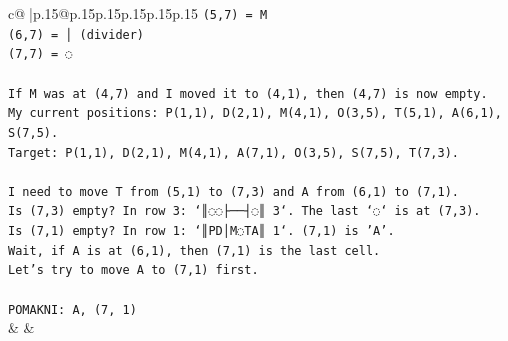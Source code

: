 \documentclass{article}
\begin{document}
{\begin{supertabular}{c@{$\;$}|p{.15\linewidth}@{}p{.15\linewidth}p{.15\linewidth}p{.15\linewidth}p{.15\linewidth}p{.15\linewidth}}
{{{\texttt{(5,7) = M} \\
\texttt{(6,7) = │ (divider)} \\
\texttt{(7,7) = ◌} \\
\\ 
\texttt{If M was at (4,7) and I moved it to (4,1), then (4,7) is now empty.} \\
\texttt{My current positions: P(1,1), D(2,1), M(4,1), O(3,5), T(5,1), A(6,1), S(7,5).} \\
\texttt{Target: P(1,1), D(2,1), M(4,1), A(7,1), O(3,5), S(7,5), T(7,3).} \\
\\ 
\texttt{I need to move T from (5,1) to (7,3) and A from (6,1) to (7,1).} \\
\texttt{Is (7,3) empty? In row 3: `║◌◌├──┤◌║ 3`. The last `◌` is at (7,3).} \\
\texttt{Is (7,1) empty? In row 1: `║PD│M◌TA║ 1`. (7,1) is 'A'.} \\
\texttt{Wait, if A is at (6,1), then (7,1) is the last cell.} \\
\texttt{Let's try to move A to (7,1) first.} \\
\\ 
\texttt{POMAKNI: A, (7, 1)} \\
            }
        }
    }
    & & \\ \\


\end{supertabular}}
\end{document}
